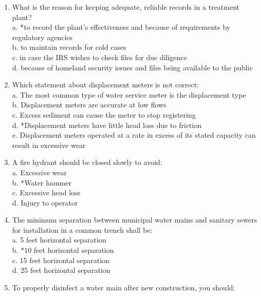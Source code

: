 \begin{enumerate}[1.]
\item What is the reason for keeping adequate, reliable records in a treatment plant?\\
a. *to record the plant's effectiveness and because of requirements by regulatory agencies\\
b. to maintain records for cold cases\\
c. in case the IRS wishes to check files for due diligence\\
d. because of homeland security issues and files being available to the public\\
\item Which statement about displacement meters is not correct:\\
a. The most common type of water service meter is the displacement type\\
b. Displacement meters are accurate at low flows\\
c. Excess sediment can cause the meter to stop registering\\
d. *Displacement meters have little head loss due to friction\\
e. Displacement meters operated at a rate in excess of its stated capacity can result in excessive wear\\
\item A fire hydrant should be closed slowly to avoid:\\
a. Excessive wear\\
b. *Water hammer\\
c. Excessive head loss\\
d. Injury to operator\\
\item The minimum separation between municipal water mains and sanitary sewers for installation in a common trench shall be:\\
a. 5 feet horizontal separation\\
b. $* 10$ feet horizontal separation\\
c. 15 feet horizontal separation\\
d. 25 feet horizontal separation\\
\item To properly disinfect a water main after new construction, you should:\\

\end{enumerate}
